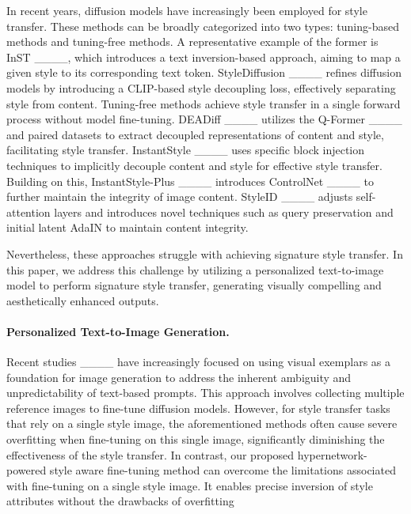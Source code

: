 In recent years, diffusion models have increasingly been employed for style transfer. These methods can be broadly categorized into two types: tuning-based methods and tuning-free methods. A representative example of the former is InST ____, which introduces a text inversion-based approach, aiming to map a given style to its corresponding text token. 
StyleDiffusion ____ refines diffusion models by introducing a CLIP-based style decoupling loss, effectively separating style from content. 
Tuning-free methods achieve style transfer in a single forward process without model fine-tuning. DEADiff ____ utilizes the Q-Former ____ and paired datasets to extract decoupled representations of content and style, facilitating style transfer. InstantStyle ____ uses specific block injection techniques to implicitly decouple content and style for effective style transfer. Building on this, InstantStyle-Plus ____ introduces ControlNet ____ to further maintain the integrity of image content. StyleID ____ adjusts self-attention layers and introduces novel techniques such as query preservation and initial latent AdaIN to maintain content integrity.

Nevertheless, these approaches struggle with achieving signature style transfer. In this paper, we address this challenge by utilizing a personalized text-to-image model to perform signature style transfer, generating visually compelling and aesthetically enhanced outputs.  


\paragraph{\textbf{Personalized Text-to-Image Generation.}} 

Recent studies ____ have increasingly focused on using visual exemplars as a foundation for image generation to address the inherent ambiguity and unpredictability of text-based prompts. This approach involves collecting multiple reference images to fine-tune diffusion models. 
However, for style transfer tasks that rely on a single style image, the aforementioned methods often cause severe overfitting when fine-tuning on this single image, significantly diminishing the effectiveness of the style transfer.
In contrast, our proposed hypernetwork-powered style aware fine-tuning method can overcome the limitations associated with fine-tuning on a single style image. It enables precise inversion of style attributes without the drawbacks of overfitting

